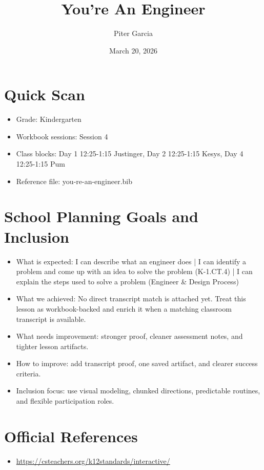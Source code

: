 \documentclass[11pt]{article}
\title{You're An Engineer}
\author{Piter Garcia}
\date{March 20, 2026}
\begin{document}
\maketitle
\section*{Quick Scan}
\begin{itemize}[leftmargin=*]
\item Grade: Kindergarten
\item Workbook sessions: Session 4
\item Class blocks: Day 1 12:25-1:15 Justinger, Day 2 12:25-1:15 Kesys, Day 4 12:25-1:15 Pum
\item Reference file: you-re-an-engineer.bib
\end{itemize}
\section*{School Planning Goals and Inclusion}
\begin{itemize}[leftmargin=*]
\item What is expected: I can describe what an engineer does | I can identify a problem and come up with an idea to solve the problem (K-1.CT.4) | I can explain the steps used to solve a problem (Engineer & Design Process)
\item What we achieved: No direct transcript match is attached yet. Treat this lesson as workbook-backed and enrich it when a matching classroom transcript is available.
\item What needs improvement: stronger proof, cleaner assessment notes, and tighter lesson artifacts.
\item How to improve: add transcript proof, one saved artifact, and clearer success criteria.
\item Inclusion focus: use visual modeling, chunked directions, predictable routines, and flexible participation roles.
\end{itemize}
\section*{Official References}
\begin{itemize}[leftmargin=*]
\item \url{https://csteachers.org/k12standards/interactive/}

\end{itemize}
\end{document}
